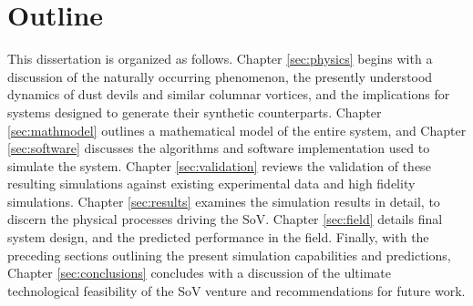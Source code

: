%





\section{Outline}

This dissertation is organized as follows. Chapter \ref{sec:physics}
begins 
with a discussion of the naturally occurring phenomenon, the presently
understood dynamics of dust devils and similar columnar vortices, and
the implications for systems designed to generate their synthetic
counterparts. Chapter \ref{sec:mathmodel} outlines a mathematical model
of the entire system, and Chapter \ref{sec:software} discusses the 
algorithms and software implementation used to simulate the
system. Chapter \ref{sec:validation} reviews the validation of
these resulting simulations against existing experimental data and high 
fidelity simulations.  
Chapter \ref{sec:results} examines the simulation results in detail, to
discern the physical processes driving the SoV. Chapter \ref{sec:field}
details final system design, and the predicted performance in the
field.  
%
%
%
%
Finally, with the preceding sections outlining the present simulation
capabilities and predictions, Chapter \ref{sec:conclusions} concludes
with a discussion of the ultimate technological feasibility of the
SoV venture and recommendations for future work. 

%
